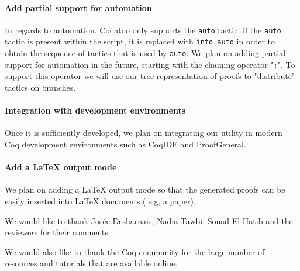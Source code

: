 \documentclass[sigplan,9pt]{acmart}\settopmatter{printfolios=true,printccs=false,printacmref=false}
\begin{document}
\paragraph{Add partial support for automation}
In regards to automation, Coqatoo only supports the \lstinline{auto} tactic: if the \lstinline{auto} tactic is present within the script, it is replaced with \lstinline{info_auto} in order to obtain the sequence of tactics that is used by \lstinline{auto}. We plan on adding partial support for automation in the future, starting with the chaining operator "\lstinline{;}". To support this operator we will use our tree representation of proofs to "distribute" tactics on branches.

\paragraph{Integration with development environments} Once it is sufficiently developed, we plan on integrating our utility in modern Coq development environments such as CoqIDE and ProofGeneral.

\paragraph{Add a LaTeX output mode} 
We plan on adding a LaTeX output mode so that the generated proofs can be easily inserted into LaTeX documents (.e.g, a paper).

\begin{acks}
  We would like to thank Josée Desharnais, Nadia Tawbi, Souad El Hatib and the reviewers for their comments.

  We would also like to thank the Coq community for the large number of resources and tutorials that are available online.
\end{acks}


\end{document}
